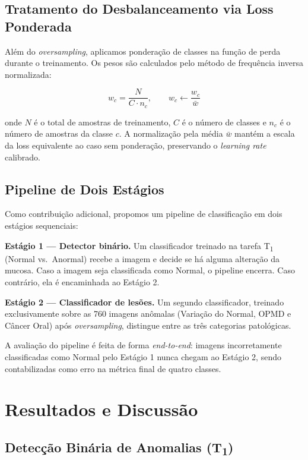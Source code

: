 \documentclass[12pt]{article}
\begin{document}
\subsection{Tratamento do Desbalanceamento via Loss Ponderada}

Além do \textit{oversampling}, aplicamos ponderação de classes na função
de perda durante o treinamento. Os pesos são calculados pelo método de
frequência inversa normalizada:

\begin{equation}
  w_c = \frac{N}{C \cdot n_c}, \qquad
  w_c \leftarrow \frac{w_c}{\bar{w}}
  \label{eq:pesos}
\end{equation}

onde $N$ é o total de amostras de treinamento, $C$ é o número de
classes e $n_c$ é o número de amostras da classe $c$.
A normalização pela média $\bar{w}$ mantém a escala da loss equivalente
ao caso sem ponderação, preservando o \textit{learning rate} calibrado.

\subsection{Pipeline de Dois Estágios}

Como contribuição adicional, propomos um pipeline de classificação em
dois estágios sequenciais:

\textbf{Estágio 1 — Detector binário.}
Um classificador treinado na tarefa T\textsubscript{1} (Normal
vs.\ Anormal) recebe a imagem e decide se há alguma alteração da
mucosa. Caso a imagem seja classificada como Normal, o pipeline
encerra. Caso contrário, ela é encaminhada ao Estágio 2.

\textbf{Estágio 2 — Classificador de lesões.}
Um segundo classificador, treinado exclusivamente sobre as 760 imagens
anômalas (Variação do Normal, OPMD e Câncer Oral) após
\textit{oversampling}, distingue entre as três categorias patológicas.

A avaliação do pipeline é feita de forma \textit{end-to-end}: imagens
incorretamente classificadas como Normal pelo Estágio 1 nunca chegam ao
Estágio 2, sendo contabilizadas como erro na métrica final de quatro
classes. 
\section{Resultados e Discussão}
\label{sec:resultados}

\subsection{\texorpdfstring{Detecção Binária de Anomalias (T\textsubscript{1})}{Detecção Binária (T1)}}
\end{document}
